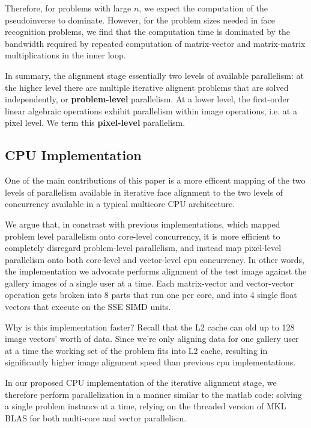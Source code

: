 \documentclass[10pt,twocolumn,letterpaper]{article}
\begin{document}
Therefore, for problems with large $n$, we expect the computation of the
pseudoinverse to dominate.  However, for the problem sizes needed in face
recognition problems, we find that the computation time is dominated by the
bandwidth required by repeated computation of matrix-vector and matrix-matrix
multiplications in the inner loop.

In summary, the alignment stage essentially two levels of available
parallelism: at the higher level there are multiple iterative alignent problems
that are solved independently, or {\bf problem-level} parallelism.  At a lower
level, the first-order linear algebraic operations exhibit parallelism within
image operations, i.e. at a pixel level.  We term this {\bf pixel-level}
parallelism.

\subsection{CPU Implementation} 
\label{sec:alignment_implementation_cpu}
One of the main contributions of this paper is a more efficent mapping of the
two levels of parallelism available in iterative face alignment to the two
levels of concurrency available in a typical multicore CPU architecture.

We argue that, in constrast with previous implementations, which mapped problem
level parallelism onto core-level concurrency, it is more efficient to
completely disregard problem-level parallelism, and instead map pixel-level
parallelism onto both core-level and vector-level cpu concurrency.  In other words,
the implementation we advocate performs alignment of the test image against the gallery
images of a single user at a time.  Each matrix-vector and vector-vector operation
gets broken into 8 parts that run one per core, and into 4 single float vectors
that execute on the SSE SIMD units.

Why is this
implementation faster?  Recall that the L2 cache can old up to 128 image
vectors' worth of data.  Since we're only aligning data for one gallery user at a
time the working set of the problem fits into L2 cache, resulting in
significantly higher image alignment speed than previous cpu implementations. 


In our proposed CPU implementation of the iterative alignment stage, we
therefore perform parallelization in a manner similar to the matlab code:
solving a single problem instance at a time, relying on the threaded version of
MKL BLAS for both multi-core and vector parallelism.  
\end{document}
